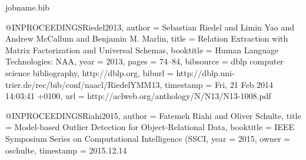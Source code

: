 {%
%	

\begin{filecontents*}{jobname.bib}
	
	@INPROCEEDINGS{Riedel2013,
		author = {Sebastian Riedel and Limin Yao and Andrew McCallum and Benjamin M.
			Marlin},
		title = {Relation Extraction with Matrix Factorization and Universal Schemas},
		booktitle = {Human Language Technologies: NAA},
		year = {2013},
		pages = {74--84},
		bibsource = {dblp computer science bibliography, http://dblp.org},
		biburl = {http://dblp.uni-trier.de/rec/bib/conf/naacl/RiedelYMM13},
		timestamp = {Fri, 21 Feb 2014 14:03:41 +0100},
		url = {http://aclweb.org/anthology/N/N13/N13-1008.pdf}
	}
	
	
	@INPROCEEDINGS{Riahi2015,
		author = {Fatemeh Riahi and Oliver Schulte},
		title = {Model-based Outlier Detection for Object-Relational Data},
		booktitle = {IEEE Symposium Series on Computational Intelligence (SSCI},
		year = {2015},
		owner = {oschulte},
		timestamp = {2015.12.14}
	}
	

\end{filecontents*}}
